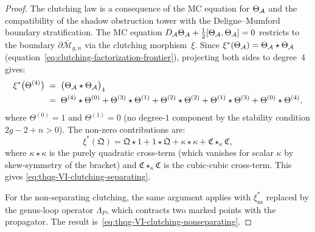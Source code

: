 \begin{proof}
The clutching law is a consequence of the MC equation for
$\Theta_{\mathcal{A}}$ and the compatibility of the shadow obstruction tower
with the Deligne--Mumford boundary stratification. The MC equation
$D_{\mathcal{A}}\Theta_{\mathcal{A}} + \tfrac{1}{2}[\Theta_{\mathcal{A}},\Theta_{\mathcal{A}}] = 0$
restricts to the boundary $\partial\overline{\mathcal{M}}_{g,n}$
via the clutching morphism~$\xi$. Since
$\xi^*(\Theta_{\mathcal{A}}) = \Theta_{\mathcal{A}} \star \Theta_{\mathcal{A}}$
(equation~\eqref{eq:clutching-factorization-frontier}), projecting
both sides to degree~$4$ gives:
\begin{align*}
\xi^*\bigl(\Theta^{(4)}\bigr)
&\;=\;
\bigl(\Theta_{\mathcal{A}} \star \Theta_{\mathcal{A}}\bigr)_4 \\
&\;=\;
\Theta^{(4)} \star \Theta^{(0)}
+ \Theta^{(3)} \star \Theta^{(1)}
+ \Theta^{(2)} \star \Theta^{(2)}
+ \Theta^{(1)} \star \Theta^{(3)}
+ \Theta^{(0)} \star \Theta^{(4)},
\end{align*}
where $\Theta^{(0)} = 1$ and $\Theta^{(1)} = 0$ (no degree-$1$
component by the stability condition $2g - 2 + n > 0$).
The non-zero contributions are:
\[
\xi^*(\mathfrak{Q})
= \mathfrak{Q} \star 1 + 1 \star \mathfrak{Q}
 + \kappa \star \kappa
 + \mathfrak{C} \star_\kappa \mathfrak{C},
\]
where $\kappa \star \kappa$ is the purely quadratic
cross-term (which vanishes for scalar $\kappa$ by
skew-symmetry of the bracket) and
$\mathfrak{C} \star_\kappa \mathfrak{C}$ is the
cubic-cubic cross-term. This gives
\eqref{eq:thqg-VI-clutching-separating}.

For the non-separating clutching, the same argument applies with
$\xi_{\mathrm{ns}}^*$ replaced by the genus-loop operator
$\Lambda_P$, which contracts two marked points with the
propagator. The result is~\eqref{eq:thqg-VI-clutching-nonseparating}.
\end{proof}

